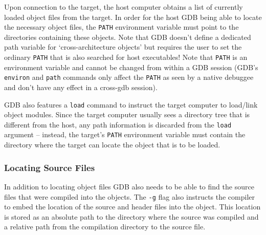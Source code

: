 \documentclass{article}
\newcommand{\cmd}[1]{{\tt #1}}
\begin{document}
	Upon connection to the target, the host computer obtains
	a list of currently loaded object files from the target.
	In order for the host GDB being able to locate the necessary
	object files, the {\tt PATH} environment variable must point to
	the directories containing these objects. Note that GDB
	doesn't define a dedicated path variable for `cross-architecture
	objects' but requires the user to set the ordinary {\tt PATH}
	that is also searched for host executables!
	Note that {\tt PATH} is an environment variable and cannot be
	changed from within a GDB session (GDB's \cmd{environ} and \cmd{path}
	commands only affect the {\tt PATH} as seen by a native debuggee
	and don't have any effect in a cross-gdb session).

	GDB also features a \cmd{load} command to instruct the target
	computer to load/link object modules. Since the target
	computer usually sees a directory tree that is different
	from the host, any path information is discarded from the
	\cmd{load} argument -- instead, the target's {\tt PATH} environment
	variable must contain the directory where the target can
	locate the object that is to be loaded.

\subsubsection{Locating Source Files}
    In addition to locating object files GDB also needs to be able
	to find the source files that were compiled into the objects.
	The {\tt -g} flag also instructs the compiler to embed the location
	of the source and header files into the object.
	This location is stored as an absolute path to the directory
	where the source was compiled and a relative path from the
    compilation directory to the source file.
\end{document}
